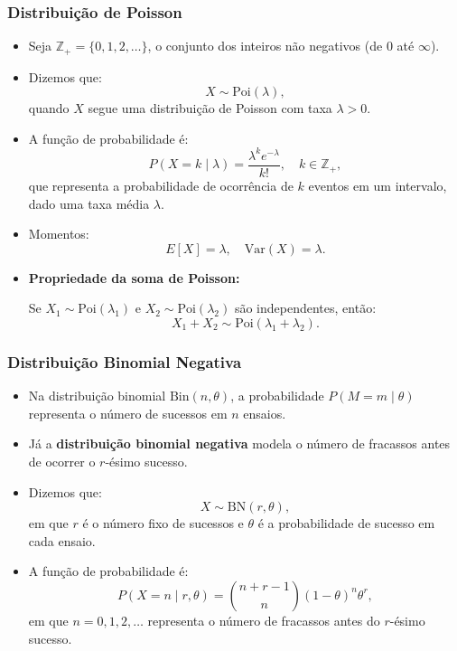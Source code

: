 \documentclass[
  letterpaper,
  DIV=11,
  numbers=noendperiod]{scrreprt}
\begin{document}
\subsubsection*{Distribuição de
Poisson}\label{distribuiuxe7uxe3o-de-poisson}

\begin{itemize}
\item
  Seja \(\mathbb{Z}_+ = \{0, 1, 2, \dots\}\), o conjunto dos inteiros
  não negativos (de \(0\) até \(\infty\)).
\item
  Dizemos que: \[X \sim \text{Poi}(\lambda),\] quando \(X\) segue uma
  distribuição de Poisson com taxa \(\lambda > 0\).
\item
  A função de probabilidade é:
  \[P(X = k \mid \lambda) = \frac{\lambda^k e^{-\lambda}}{k!}, \quad k \in \mathbb{Z}_+,\]
  que representa a probabilidade de ocorrência de \(k\) eventos em um
  intervalo, dado uma taxa média \(\lambda\).
\item
  Momentos: \[E[X] = \lambda, \quad \text{Var}(X) = \lambda.\]
\item
  \textbf{Propriedade da soma de Poisson:}

  Se \(X_1 \sim \text{Poi}(\lambda_1)\) e
  \(X_2 \sim \text{Poi}(\lambda_2)\) são independentes, então:
  \[X_1 + X_2 \sim \text{Poi}(\lambda_1 + \lambda_2).\]
\end{itemize}

\subsubsection*{Distribuição Binomial
Negativa}\label{distribuiuxe7uxe3o-binomial-negativa}

\begin{itemize}
\item
  Na distribuição binomial \(\text{Bin}(n, \theta)\), a probabilidade
  \(P(M = m \mid \theta)\) representa o número de sucessos em \(n\)
  ensaios.
\item
  Já a \textbf{distribuição binomial negativa} modela o número de
  fracassos antes de ocorrer o \(r\)-ésimo sucesso.
\item
  Dizemos que: \[X \sim \text{BN}(r, \theta),\] em que \(r\) é o número
  fixo de sucessos e \(\theta\) é a probabilidade de sucesso em cada
  ensaio.
\item
  A função de probabilidade é: \[P(X = n \mid r, \theta)
  =
  \binom{n + r - 1}{n}
  (1 - \theta)^n \theta^r,\] em que \(n = 0, 1, 2, \dots\) representa o
  número de fracassos antes do \(r\)-ésimo sucesso.
\end{itemize}
\end{document}
